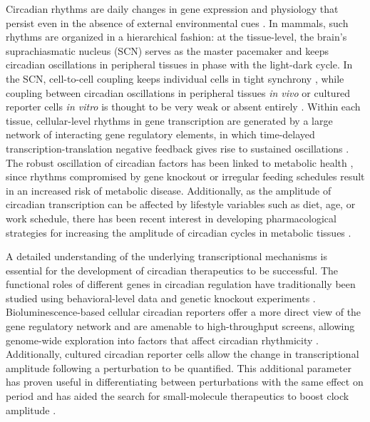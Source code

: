 \documentclass[11pt, letterpaper]{article}
\begin{document}
Circadian rhythms are daily changes in gene expression and physiology that persist even in the absence of external environmental cues \cite{Herzog2007}.
In mammals, such rhythms are organized in a hierarchical fashion: at the tissue-level, the brain's suprachiasmatic nucleus (SCN) serves as the master pacemaker and keeps circadian oscillations in peripheral tissues in phase with the light-dark cycle.
In the SCN, cell-to-cell coupling keeps individual cells in tight synchrony \cite{Herzog2004}, while coupling between circadian oscillations in peripheral tissues {\itshape in vivo} or cultured reporter cells {\itshape in vitro} is thought to be very weak or absent entirely \cite{Guenthner2014, Noguchi2013}.
Within each tissue, cellular-level rhythms in gene transcription are generated by a large network of interacting gene regulatory elements, in which time-delayed transcription-translation negative feedback gives rise to sustained oscillations \cite{Ueda2005}.
The robust oscillation of circadian factors has been linked to metabolic health \cite{Bass2012}, since rhythms compromised by gene knockout \cite{Marcheva2010} or irregular feeding schedules \cite{Hatori2012} result in an increased risk of metabolic disease.
Additionally, as the amplitude of circadian transcription can be affected by lifestyle variables such as diet, age, or work schedule, there has been recent interest in developing pharmacological strategies for increasing the amplitude of circadian cycles in metabolic tissues \cite{Chen2013}.

A detailed understanding of the underlying transcriptional mechanisms is essential for the development of circadian therapeutics to be successful. 
The functional roles of different genes in circadian regulation have traditionally been studied using behavioral-level data and genetic knockout experiments \cite{Vitaterna1994}.
Bioluminescence-based cellular circadian reporters offer a more direct view of the gene regulatory network \cite{Balsalobre1998} and are amenable to high-throughput screens, allowing genome-wide exploration into factors that affect circadian rhythmicity \cite{Zhang2009}.
Additionally, cultured circadian reporter cells allow the change in transcriptional amplitude following a perturbation to be quantified.
This additional parameter has proven useful in differentiating between perturbations with the same effect on period \cite{St.John2014} and has aided the search for small-molecule therapeutics to boost clock amplitude \cite{Chen2013}.
\end{document}
